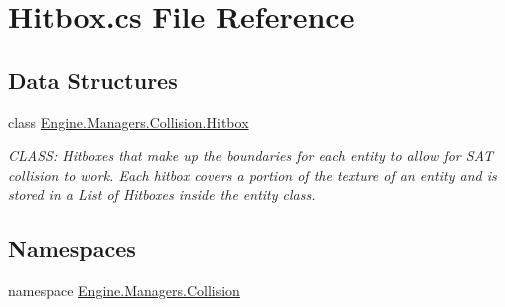 \hypertarget{a00161}{}\section{Hitbox.\+cs File Reference}
\label{a00161}
\subsection*{Data Structures}
\begin{DoxyCompactItemize}
\item 
class \hyperlink{a00506}{Engine.\+Managers.\+Collision.\+Hitbox}
\begin{DoxyCompactList}\small\item\em C\+L\+A\+SS\+: Hitboxes that make up the boundaries for each entity to allow for S\+AT collision to work. Each hitbox covers a portion of the texture of an entity and is stored in a List of Hitboxes inside the entity class. \end{DoxyCompactList}\end{DoxyCompactItemize}
\subsection*{Namespaces}
\begin{DoxyCompactItemize}
\item 
namespace \hyperlink{a00268}{Engine.\+Managers.\+Collision}
\end{DoxyCompactItemize}
